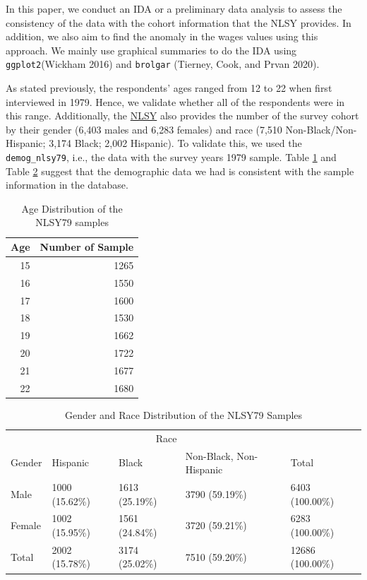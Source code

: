 \documentclass{article}
\begin{document}
In this paper, we conduct an IDA or a preliminary data analysis to assess the consistency of the data with the cohort information that the NLSY provides. In addition, we also aim to find the anomaly in the wages values using this approach. We mainly use graphical summaries to do the IDA using \texttt{ggplot2}(Wickham 2016) and \texttt{brolgar} (Tierney, Cook, and Prvan 2020).

As stated previously, the respondents' ages ranged from 12 to 22 when first interviewed in 1979. Hence, we validate whether all of the respondents were in this range. Additionally, the \href{https://www.nlsinfo.org/content/cohorts/nlsy79/intro-to-the-sample/nlsy79-sample-introduction}{NLSY} also provides the number of the survey cohort by their gender (6,403 males and 6,283 females) and race (7,510 Non-Black/Non-Hispanic; 3,174 Black; 2,002 Hispanic). To validate this, we used the \texttt{demog\_nlsy79}, i.e., the data with the survey years 1979 sample. Table \ref{tab:age-table} and Table \ref{tab:gender-race-table} suggest that the demographic data we had is consistent with the sample information in the database.

\begin{table}

\caption{\label{tab:age-table}Age Distribution of the NLSY79 samples}
\centering
\begin{tabular}[t]{rr}
\toprule
Age & Number of Sample\\
\midrule
15 & 1265\\
16 & 1550\\
17 & 1600\\
18 & 1530\\
19 & 1662\\
20 & 1722\\
21 & 1677\\
22 & 1680\\
\bottomrule
\end{tabular}
\end{table}

\begin{table}

\caption{\label{tab:gender-race-table}Gender and Race Distribution of the NLSY79 Samples}
\centering
\begin{tabular}[t]{lllll}
\toprule
\multicolumn{1}{c}{ } & \multicolumn{3}{c}{Race} & \multicolumn{1}{c}{ } \\
\cmidrule(l{3pt}r{3pt}){2-4}
Gender & Hispanic & Black & Non-Black, Non-Hispanic & Total\\
\midrule
Male & 1000 (15.62\%) & 1613 (25.19\%) & 3790 (59.19\%) & 6403 (100.00\%)\\
Female & 1002 (15.95\%) & 1561 (24.84\%) & 3720 (59.21\%) & 6283 (100.00\%)\\
Total & 2002 (15.78\%) & 3174 (25.02\%) & 7510 (59.20\%) & 12686 (100.00\%)\\
\bottomrule
\end{tabular}
\end{table}
\end{document}
